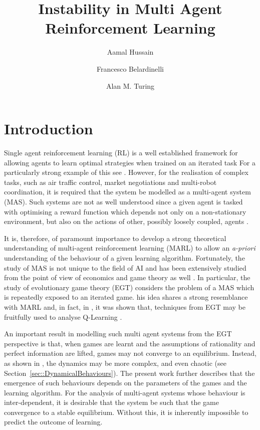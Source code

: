 \documentclass[sigconf,anonymous]{aamas}
\title[InstabilityinMARL]{Instability in Multi Agent Reinforcement Learning}
\author{Aamal Hussain}
\affiliation{
  \institution{Secret Intelligence Service}
  \city{Vauxhall, London}}
\author{Francesco Belardinelli}
\affiliation{
  \institution{Analytical Engines, Inc.}
  \city{Ockham Park}
  \state{Surrey}}
\author{Alan M. Turing}
\affiliation{
  \department{Computing Machine Laboratory}
  \institution{Victoria University of Manchester}}
\begin{document}

\pagestyle{fancy}
\fancyhead{}


\maketitle 


\section{Introduction}

Single agent reinforcement learning (RL) is a well established framework for allowing agents to learn optimal strategies when trained on an iterated task 
For a particularly strong example of this see \cite{Vinyals2019}. However, for the realisation of complex tasks, such as air traffic control, market negotiations and multi-robot coordination, it is required that the system be modelled as a multi-agent system (MAS). Such systems are not as well understood since a given agent is tasked with optimising a reward function which depends not only on a non-stationary environment, but also on the actions of other, possibly loosely coupled, agents \cite{SchwartzMulti-agentApproach}. 

It is, therefore, of paramount importance to develop a strong theoretical understanding of multi-agent reinforcement learning (MARL) to allow an {\em a-priori} understanding of the behaviour of a given learning algorithm. Fortunately, the study of MAS is not unique to the field of AI and has been extensively studied from the point of view of economics and game theory as well \cite{ShohamMultiagentFoundations}. In particular, the study of evolutionary game theory (EGT) considers the problem of a MAS which is repeatedly exposed to an iterated game. 
his idea shares a strong resemblance with MARL and, in fact, in \cite{Tuyls2006AnGames}, it was shown that, techniques from EGT may be fruitfully used to analyse Q-Learning \cite{Sutton2018}.

An important result in modelling such multi agent systems from the EGT perspective is that, when games are learnt and the assumptions of rationality and perfect information are lifted, games may not converge to an equilibrium. Instead, as shown in \cite{Sanders2018}, the dynamics may be more complex, and even chaotic (see Section~\ref{sec::DynamicalBehaviours}). The present work further describes that the emergence of such behaviours depends on the parameters of the games and the learning algorithm. For the analysis of multi-agent systems whose behaviour is inter-dependent, it is desirable that the system be such that the game convergence to a stable equilibrium. Without this, it is inherently impossible to predict the outcome of learning.  
\end{document}
